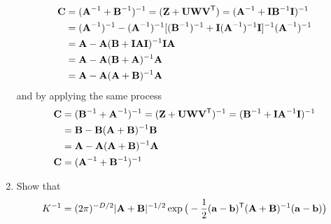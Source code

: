 \documentclass{amsmlaj}
\begin{document}
\begin{problem}
\begin{enumerate}
	\begin{equation}
		\begin{split}
			\vt{C}&=(\vt{A}^{-1}+\vt{B}^{-1})^{-1}
			=(\vt{Z}+\vt{U}\vt{W}\vt{V}^\trans)
			=(\vt{A}^{-1}+\vt{I}\vt{B}^{-1}\vt{I})^{-1} \\
			&=(\vt{A}^{-1})^{-1}-(\vt{A}^{-1})^{-1}[(\vt{B}^{-1})^{-1}
			+\vt{I}(\vt{A}^{-1})^{-1}\vt{I}]^{-1}(\vt{A}^{-1})^{-1} \\
			&=\vt{A}-\vt{A}(\vt{B}+\vt{I}\vt{A}\vt{I})^{-1}\vt{I}\vt{A} \\
			&=\vt{A}-\vt{A}(\vt{B}+\vt{A})^{-1}\vt{A} \\
			&=\vt{A}-\vt{A}(\vt{A}+\vt{B})^{-1}\vt{A}
		\end{split}
	\end{equation}
	and by applying the same process
	\begin{equation}
		\begin{split}
			\vt{C}&=(\vt{B}^{-1}+\vt{A}^{-1})^{-1}
			=(\vt{Z}+\vt{U}\vt{W}\vt{V}^\trans)^{-1}
			=(\vt{B}^{-1}+\vt{I}\vt{A}^{-1}\vt{I})^{-1} \\
			&=\vt{B}-\vt{B}(\vt{A}+\vt{B})^{-1}\vt{B} \\
			&=\vt{A}-\vt{A}(\vt{A}+\vt{B})^{-1}\vt{A} \\
			\vt{C}&=(\vt{A}^{-1}+\vt{B}^{-1})^{-1}
		\end{split}
	\end{equation}

\item Show that
				\begin{equation}
								K^{-1} = (2\pi)^{-D/2}|\vt{A}+\vt{B}|^{-1/2}
								\exp\big( -\frac{1}{2}(\vt{a}-\vt{b})^\trans
								(\vt{A}+\vt{B})^{-1} (\vt{a}-\vt{b})\big)
				\end{equation}


\end{enumerate}
\end{problem}
\end{document}
